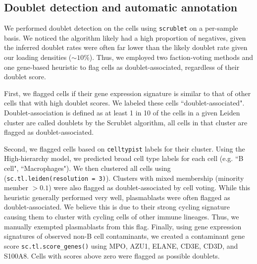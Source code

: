 \subsection{Doublet detection and automatic annotation}
\label{sec:doublet-annotation}
We performed doublet detection on the cells using \verb|scrublet| \cite{wolock2019scrublet} on a per-sample basis. We noticed the algorithm likely had a high proportion of negatives, given the inferred doublet rates were often far lower than the likely doublet rate given our loading densities ($\sim 10\%$). Thus, we employed two faction-voting methods and one gene-based heuristic to flag cells as doublet-associated, regardless of their doublet score.

First, we flagged cells if their gene expression signature is similar to that of other cells that with high doublet scores. We labeled these cells ``doublet-associated". Doublet-association is defined as at least 1 in 10 of the cells in a given Leiden cluster are called doublets by the Scrublet algorithm, all cells in that cluster are flagged as doublet-associated. 

Second, we flagged cells based on \verb|celltypist| labels for their cluster. Using the High-hierarchy model, we predicted broad cell type labels for each cell (e.g. ``B cell", ``Macrophages"). We then clustered all cells using (\verb|sc.tl.leiden(resolution = 3)|). Clusters with mixed membership (minority member $> 0.1$) were also flagged as doublet-associated by cell voting. While this heuristic generally performed very well, plasmablasts were often flagged as doublet-associated. We believe this is due to their strong cycling signature causing them to cluster with cycling cells of other immune lineages. Thus, we manually exempted plasmablasts from this flag.
Finally, using gene expression signatures of observed non-B cell contaminants, we created a contaminant gene score \verb|sc.tl.score_genes()| using MPO, AZU1, ELANE, CD3E, CD3D, and S100A8. Cells with scores above zero were flagged as possible doublets.
 
